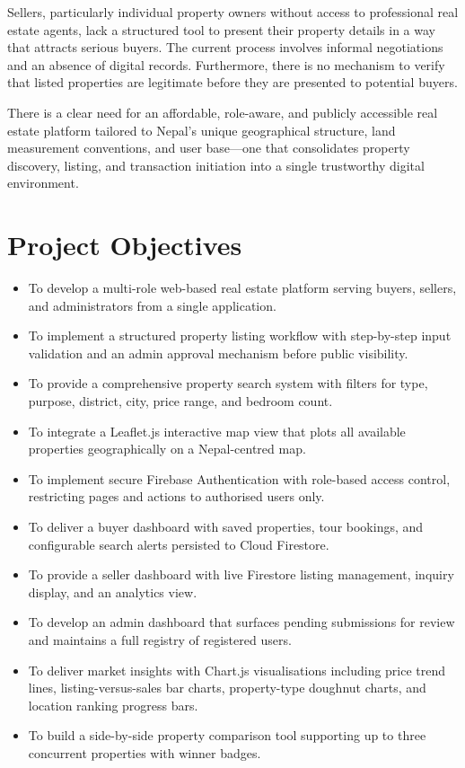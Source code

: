 \documentclass[12pt,a4paper]{report}
\begin{document}
Sellers, particularly individual property owners without access to professional
real estate agents, lack a structured tool to present their property details in
a way that attracts serious buyers. The current process involves informal
negotiations and an absence of digital records. Furthermore, there is no
mechanism to verify that listed properties are legitimate before they are
presented to potential buyers.

There is a clear need for an affordable, role-aware, and publicly accessible real
estate platform tailored to Nepal's unique geographical structure, land
measurement conventions, and user base---one that consolidates property discovery,
listing, and transaction initiation into a single trustworthy digital environment.

\section{Project Objectives}

\begin{itemize}[leftmargin=2.5em]
  \item To develop a multi-role web-based real estate platform serving buyers,
        sellers, and administrators from a single application.
  \item To implement a structured property listing workflow with step-by-step
        input validation and an admin approval mechanism before public visibility.
  \item To provide a comprehensive property search system with filters for type,
        purpose, district, city, price range, and bedroom count.
  \item To integrate a Leaflet.js interactive map view that plots all available
        properties geographically on a Nepal-centred map.
  \item To implement secure Firebase Authentication with role-based access
        control, restricting pages and actions to authorised users only.
  \item To deliver a buyer dashboard with saved properties, tour bookings, and
        configurable search alerts persisted to Cloud Firestore.
  \item To provide a seller dashboard with live Firestore listing management,
        inquiry display, and an analytics view.
  \item To develop an admin dashboard that surfaces pending submissions for
        review and maintains a full registry of registered users.
  \item To deliver market insights with Chart.js visualisations including price
        trend lines, listing-versus-sales bar charts, property-type doughnut
        charts, and location ranking progress bars.
  \item To build a side-by-side property comparison tool supporting up to three
        concurrent properties with winner badges.
\end{itemize}
\end{document}
